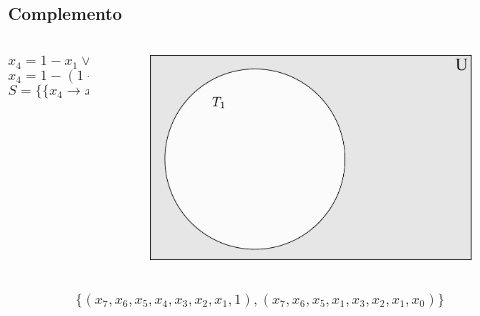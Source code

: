 \documentclass[aspectratio=43,hyperref={pdfpagelabels=false}]{beamer}
\begin{document}
\begin{frame}
    \frametitle{Complemento}
    \begin{columns}
        \begin{column}{5cm}
        \begin{equation}
        x_4 = 1 - x_1 \vee x_0 = 0
        \end{equation}
        \begin{equation}
        x_4 = 1 - (1 - x_1) \vee 
        x_0 = 1 - 0
        \end{equation}
        \begin{equation}
        S = \{\{x_4 \to x_1\},\{x_0\to 1\}\}
        \end{equation}
    \end{column}

    \begin{column}{5cm}
        \begin{figure}[h!]
          \centering
          \includegraphics[width=.7\textwidth]{fig_complement3.pdf}
        \end{figure}
    \end{column}
\end{columns}
\begin{equation}
\{(x_7, x_6, x_5, x_4, x_3, x_2, x_1, 1),(x_7, x_6, x_5, x_1, x_3, x_2, x_1, x_0)\}
\end{equation}
\end{frame}

   
\end{document}
